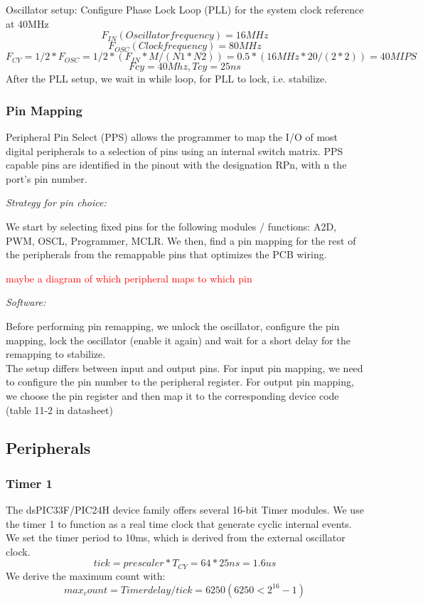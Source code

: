 Oscillator setup:
Configure Phase Lock Loop (PLL) for the system clock reference at 40MHz 
	$$F_{IN} (Oscillator frequency) = 16MHz  $$  
    $$F_{OSC} (Clock frequency) =  80MHz$$
 	$$F_{CY} = 1/2 * F_{OSC} = 1/2 * (F_{IN}*M/(N1*N2)) = 0.5 * (16MHz*20/(2*2)) = 40 MIPS$$
$$Fcy=40Mhz, Tcy=25ns$$
After the PLL setup, we wait in while loop, for PLL to lock, i.e. stabilize. 

\subsubsection*{Pin Mapping}

Peripheral Pin Select (PPS) allows the programmer to map the I/O of most digital peripherals to a selection of pins using an internal switch matrix.
PPS capable pins are identified in the pinout with the designation RPn, with n the port’s pin number. 

\textit{Strategy for pin choice:}

We start by selecting fixed pins for the following modules / functions: A2D, PWM, OSCL, Programmer, MCLR. We then, find a pin mapping for the rest of the peripherals from the remappable pins that optimizes the PCB wiring.

\textcolor{red}{
maybe a diagram of which peripheral maps to which pin
}

\textit{Software:}

Before performing pin remapping, we unlock the oscillator, configure the pin mapping, lock the oscillator (enable it again) and wait for a short delay for the remapping to stabilize.\\
The setup differs between input and output pins. For input pin mapping, we need to configure the pin number to the peripheral register. For output pin mapping, we choose the pin register and then map it to the corresponding device code (table 11-2 in datasheet)

\subsection{Peripherals}
\subsubsection*{Timer 1}
The dsPIC33F/PIC24H device family offers several 16-bit Timer modules. We use the timer 1 to function as a real time clock that generate cyclic internal events.\\
We set the timer period to 10ms, which is derived from the external oscillator clock.
$$tick=prescaler*T_{CY}= 64*25ns= 1.6us $$ 
We derive the maximum count with:
$$max_count=Timer delay/tick=6250 (6250<2^{16}-1)$$

